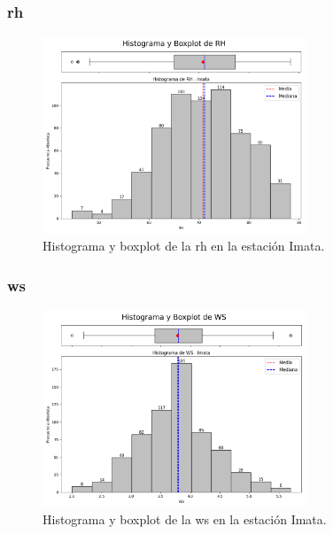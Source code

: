 \subsubsection*{\gls{rh} }
\begin{figure}[htbp]
\centering
\includegraphics[width=0.7\textwidth]{resultados/por_estacion_meteorologica/Imata/RH_histograma.png}
\caption{Histograma y boxplot de la \gls{rh}  en la estación Imata.}
\label{fig:imata_RH}
\end{figure}

\subsubsection*{\gls{ws} }
\begin{figure}[htbp]
\centering
\includegraphics[width=0.7\textwidth]{resultados/por_estacion_meteorologica/Imata/WS_histograma.png}
\caption{Histograma y boxplot de la \gls{ws}  en la estación Imata.}
\label{fig:imata_WS}
\end{figure}


